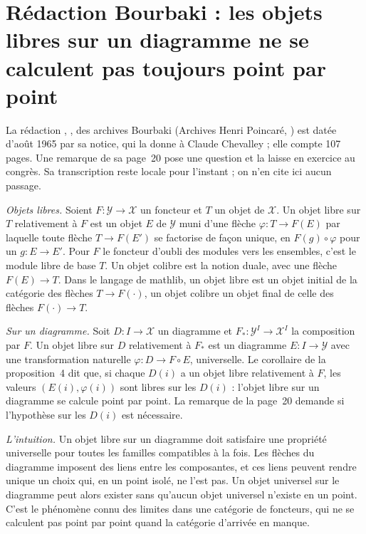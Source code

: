 \section[Rédaction Bourbaki \redac{448} : objets libres sur un diagramme]{Rédaction Bourbaki  : les objets libres sur un diagramme ne se calculent pas toujours point par point\protect\piste\protect{}}\label{sec:bourbaki-448}

La rédaction , , des archives Bourbaki (Archives Henri Poincaré, ) est datée d'août 1965 par sa notice, qui la donne à Claude Chevalley ; elle compte 107 pages. Une remarque de sa page~20 pose une question et la laisse en exercice au congrès. Sa transcription reste locale pour l'instant ; on n'en cite ici aucun passage.

\emph{Objets libres.} Soient $F : \mathcal Y \to \mathcal X$ un foncteur et $T$ un objet de $\mathcal X$. Un objet libre sur $T$ relativement à $F$ est un objet $E$ de $\mathcal Y$ muni d'une flèche $\varphi : T \to F(E)$ par laquelle toute flèche $T \to F(E')$ se factorise de façon unique, en $F(g) \circ \varphi$ pour un $g : E \to E'$. Pour $F$ le foncteur d'oubli des modules vers les ensembles, c'est le module libre de base $T$. Un objet colibre est la notion duale, avec une flèche $F(E) \to T$. Dans le langage de mathlib, un objet libre est un objet initial de la catégorie des flèches $T \to F(\cdot)$, un objet colibre un objet final de celle des flèches $F(\cdot) \to T$.

\emph{Sur un diagramme.} Soit $D : I \to \mathcal X$ un diagramme et $F_* : \mathcal Y^I \to \mathcal X^I$ la composition par $F$. Un objet libre sur $D$ relativement à $F_*$ est un diagramme $E : I \to \mathcal Y$ avec une transformation naturelle $\varphi : D \to F \circ E$, universelle. Le corollaire de la proposition~4 dit que, si chaque $D(i)$ a un objet libre relativement à $F$, les valeurs $(E(i), \varphi(i))$ sont libres sur les $D(i)$ : l'objet libre sur un diagramme se calcule point par point. La remarque de la page~20 demande si l'hypothèse sur les $D(i)$ est nécessaire.

\emph{L'intuition.} Un objet libre sur un diagramme doit satisfaire une propriété universelle pour toutes les familles compatibles à la fois. Les flèches du diagramme imposent des liens entre les composantes, et ces liens peuvent rendre unique un choix qui, en un point isolé, ne l'est pas. Un objet universel sur le diagramme peut alors exister sans qu'aucun objet universel n'existe en un point. C'est le phénomène connu des limites dans une catégorie de foncteurs, qui ne se calculent pas point par point quand la catégorie d'arrivée en manque.

